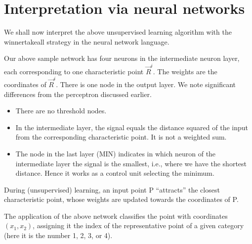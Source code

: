 \documentclass[letterpaper,10pt,english]{jupyterBook}
\begin{document}
\section{Interpretation via neural networks}
\label{\detokenize{docs/unsupervised:interpretation-via-neural-networks}}\label{\detokenize{docs/unsupervised:inn-sec}}
\sphinxAtStartPar
We shall now interpret the above unsupervised learning algorithm with the winner\sphinxhyphen{}take\sphinxhyphen{}all strategy in the neural network language.

\noindent{}

\sphinxAtStartPar
Our above sample network has four neurons in the intermediate neuron layer, each corresponding to one characteristic point \(\vec{R}^i\). The weights are the coordinates of \(\vec{R}^i\). There is one node in the output layer. We note significant differences from the perceptron discussed earlier.
\begin{itemize}
\item {} 
\sphinxAtStartPar
There are no threshold nodes.

\item {} 
\sphinxAtStartPar
In the intermediate layer, the signal equals the distance squared of the input from the corresponding characteristic point. It is not a weighted sum.

\item {} 
\sphinxAtStartPar
The node in the last layer (MIN) indicates in which neuron of the intermediate layer the signal is the smallest, i.e., where we have the shortest distance. Hence it works as a control unit selecting the minimum.

\end{itemize}

\sphinxAtStartPar
During (unsupervised) learning, an input point P “attracts” the closest characteristic point, whose weights are updated towards the coordinates of P.

\sphinxAtStartPar
The application of the above network classifies the point with coordinates \((x_1, x_2)\), assigning it the index of the representative point of a given category (here it is the number 1, 2, 3, or 4).
\end{document}
